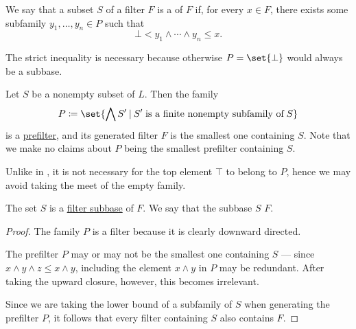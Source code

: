 \begin{definition}\label{def:filter_subbase}\mimprovised
  We say that a subset \( S \) of a filter \( F \) is a  of \( F \) if, for every \( x \in F \), there exists some subfamily \( y_1, \ldots, y_n \in P \) such that
  \begin{equation}\label{eq:def:filter_subbase}
    \bot < y_1 \wedge \cdots \wedge y_n \leq x.
  \end{equation}

  The strict inequality is necessary because otherwise \( P = \set{ \bot } \) would always be a subbase.
\end{definition}

\begin{proposition}\label{thm:filter_from_subbase}
  Let \( S \) be a nonempty subset of \( L \). Then the family
  \begin{equation*}
    P \coloneqq \set{ \bigwedge S' \given S' \T{is a finite nonempty subfamily of} S }
  \end{equation*}
  is a \hyperref[def:prefilter]{prefilter}, and its generated filter \( F \) is the smallest one containing \( S \). Note that we make no claims about \( P \) being the smallest prefilter containing \( S \).

  Unlike in , it is not necessary for the top element \( \top \) to belong to \( P \), hence we may avoid taking the meet of the empty family.

  The set \( S \) is a \hyperref[def:filter_subbase]{filter subbase} of \( F \). We say that the subbase \( S \)  \( F \).
\end{proposition}
\begin{proof}
  The family \( P \) is a filter because it is clearly downward directed.

  The prefilter \( P \) may or may not be the smallest one containing \( S \) --- since \( x \wedge y \wedge z \leq x \wedge y \), including the element \( x \wedge y \) in \( P \) may be redundant. After taking the upward closure, however, this becomes irrelevant.

  Since we are taking the  lower bound of a subfamily of \( S \) when generating the prefilter \( P \), it follows that every filter containing \( S \) also contains \( F \).
\end{proof}

